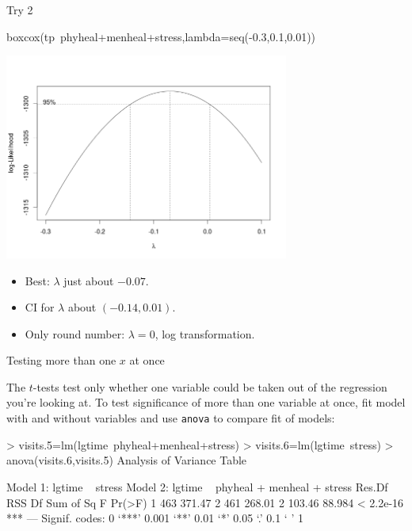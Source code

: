 \begin{frame}[fragile]{Try 2}

{\footnotesize
  \begin{semiverbatim}
boxcox(tp~phyheal+menheal+stress,lambda=seq(-0.3,0.1,0.01))
    \end{semiverbatim}
}
\includegraphics[width=0.7\textwidth]{boxcox2}
\begin{itemize}
\item Best: $\lambda$ just about $-0.07$.
\item CI for $\lambda$ about $(-0.14,0.01)$.
\item Only round number: $\lambda=0$, log transformation.
\end{itemize}

\end{frame}



\begin{frame}[fragile]{Testing more than one $x$ at once}

The $t$-tests test only whether one variable could be taken out of the
regression you're looking at. To test significance of more than one
variable at once, fit model with and without variables and use
\texttt{anova} to compare fit of models:

{\small
\begin{semiverbatim}
> visits.5=lm(lgtime~phyheal+menheal+stress)
> visits.6=lm(lgtime~stress)
> anova(visits.6,visits.5)
Analysis of Variance Table

Model 1: lgtime ~ stress
Model 2: lgtime ~ phyheal + menheal + stress
  Res.Df    RSS Df Sum of Sq      F    Pr(>F)    
1    463 371.47                                  
2    461 268.01  2    103.46 88.984 < 2.2e-16 ***
---
Signif. codes:  0 ‘***’ 0.001 ‘**’ 0.01 ‘*’ 0.05 ‘.’ 0.1 ‘ ’ 1 
\end{semiverbatim}
}

\end{frame}

